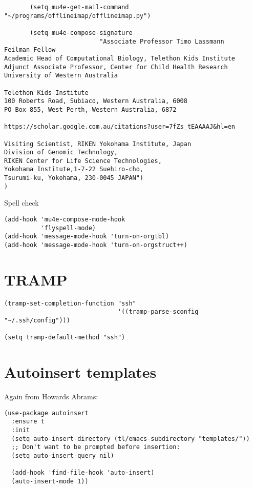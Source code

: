 \documentclass[12pt]{article}
\begin{document}
\begin{lstlisting}
       (setq mu4e-get-mail-command "~/programs/offlineimap/offlineimap.py")

       (setq mu4e-compose-signature
                          "Associate Professor Timo Lassmann
Feilman Fellow
Academic Head of Computational Biology, Telethon Kids Institute
Adjunct Associate Professor, Center for Child Health Research
University of Western Australia

Telethon Kids Institute
100 Roberts Road, Subiaco, Western Australia, 6008
PO Box 855, West Perth, Western Australia, 6872

https://scholar.google.com.au/citations?user=7fZs_tEAAAAJ&hl=en

Visiting Scientist, RIKEN Yokohama Institute, Japan
Division of Genomic Technology,
RIKEN Center for Life Science Technologies,
Yokohama Institute,1-7-22 Suehiro-cho,
Tsurumi-ku, Yokohama, 230-0045 JAPAN")
)
\end{lstlisting}

Spell check 

\lstset{language=Lisp,label= ,caption= ,numbers=none}
\begin{lstlisting}
(add-hook 'mu4e-compose-mode-hook
          'flyspell-mode)
(add-hook 'message-mode-hook 'turn-on-orgtbl)
(add-hook 'message-mode-hook 'turn-on-orgstruct++)
\end{lstlisting}

\section{TRAMP}
\label{sec-9}

\lstset{language=Lisp,label= ,caption= ,numbers=none}
\begin{lstlisting}
(tramp-set-completion-function "ssh"
                               '((tramp-parse-sconfig "~/.ssh/config")))

(setq tramp-default-method "ssh")
\end{lstlisting}

\section{Autoinsert templates}
\label{sec-10}

Again from Howards Abrams: 
\lstset{language=Lisp,label= ,caption= ,numbers=none}
\begin{lstlisting}
(use-package autoinsert
  :ensure t
  :init
  (setq auto-insert-directory (tl/emacs-subdirectory "templates/"))
  ;; Don't want to be prompted before insertion:
  (setq auto-insert-query nil)

  (add-hook 'find-file-hook 'auto-insert)
  (auto-insert-mode 1))
\end{lstlisting}
\end{document}

